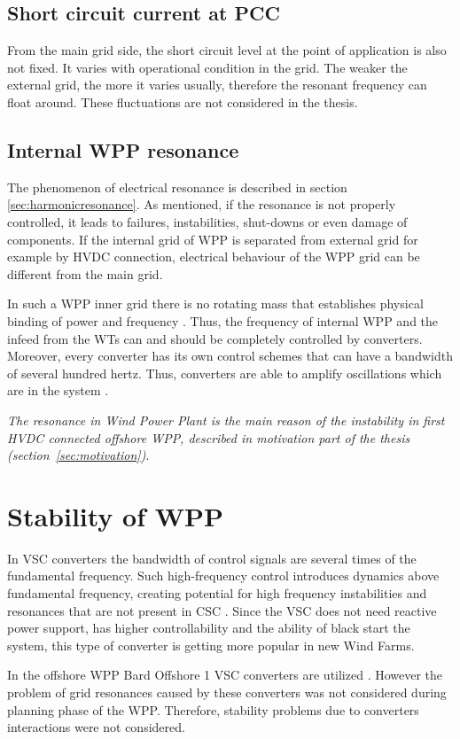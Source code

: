 \documentclass[12pt]{report} %
\begin{document}
\section{Short circuit current at PCC}
From the main grid side, the short circuit level at the point of application is also not fixed. It varies with operational condition in the grid. The weaker the external grid, the more it varies usually, therefore the resonant frequency can float around. These fluctuations are not considered in the thesis.

\section{Internal WPP resonance}
The phenomenon of electrical resonance is described in section \ref{sec:harmonicresonance}. As mentioned, if the resonance is not properly controlled, it leads to failures, instabilities, shut-downs or even damage of components. If the internal grid of WPP is separated from external grid for example by HVDC connection, electrical behaviour of the WPP grid can be different from the main grid.

In such a WPP inner grid there is no rotating mass that establishes physical binding of power and frequency \cite{borwin1}. Thus, the frequency of internal WPP and the infeed from the WTs can and should be completely controlled by converters. Moreover, every converter has its own control schemes that can have a bandwidth of several hundred hertz. Thus, converters are able to amplify oscillations which are in the system \cite{borwin1}.

\textit{The resonance in Wind Power Plant is the main reason of the instability in first HVDC connected offshore WPP, described in motivation part of the thesis (section~\ref{sec:motivation})}.

\chapter{Stability of WPP}
In VSC converters the bandwidth of control signals are several times of the fundamental frequency. Such high-frequency control introduces dynamics above fundamental frequency, creating potential for high frequency instabilities and resonances that are not present in CSC \cite{liusun2014}. Since the VSC does not need reactive power support, has higher controllability and the ability of black start the system, this type of converter is getting more popular in new Wind Farms.

In the offshore WPP Bard Offshore 1 VSC converters are utilized \cite{borwin1}. However the problem of grid resonances caused by these converters was not considered during planning phase of the WPP. Therefore, stability problems due to converters interactions were not considered.
\end{document}
